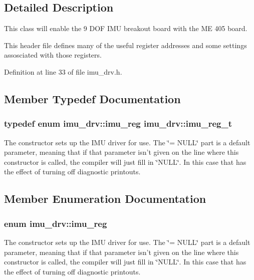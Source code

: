 \subsection{Detailed Description}
This class will enable the 9 D\-O\-F I\-M\-U breakout board with the M\-E 405 board. 

This header file defines many of the useful register addresses and some settings assosciated with those registers. 

Definition at line 33 of file imu\-\_\-drv.\-h.



\subsection{Member Typedef Documentation}
\hypertarget{classimu__drv_a5af10b56ac161eafe231540cbc22f680}{
\subsubsection[{imu\-\_\-reg\-\_\-t}]{\setlength{\rightskip}{0pt plus 5cm}typedef enum {\bf imu\-\_\-drv\-::imu\-\_\-reg}  {\bf imu\-\_\-drv\-::imu\-\_\-reg\-\_\-t}}}\label{classimu__drv_a5af10b56ac161eafe231540cbc22f680}
The constructor sets up the I\-M\-U driver for use. The \char`\"{}= N\-U\-L\-L\char`\"{} part is a default parameter, meaning that if that parameter isn't given on the line where this constructor is called, the compiler will just fill in \char`\"{}\-N\-U\-L\-L\char`\"{}. In this case that has the effect of turning off diagnostic printouts. 

\subsection{Member Enumeration Documentation}
\hypertarget{classimu__drv_ae3b2e2b681ec835e7686c7b333a53cb9}{
\subsubsection[{imu\-\_\-reg}]{\setlength{\rightskip}{0pt plus 5cm}enum {\bf imu\-\_\-drv\-::imu\-\_\-reg}}}\label{classimu__drv_ae3b2e2b681ec835e7686c7b333a53cb9}
The constructor sets up the I\-M\-U driver for use. The \char`\"{}= N\-U\-L\-L\char`\"{} part is a default parameter, meaning that if that parameter isn't given on the line where this constructor is called, the compiler will just fill in \char`\"{}\-N\-U\-L\-L\char`\"{}. In this case that has the effect of turning off diagnostic printouts. 

